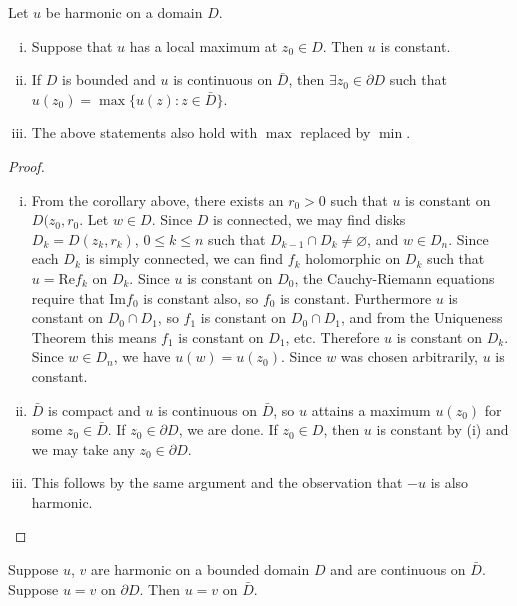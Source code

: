 \begin{theorem}
Let $u$ be harmonic on a domain $D$.
\begin{enumerate}[(i)]
  \item{
    Suppose that $u$ has a local maximum at $z_0 \in D$.
    Then $u$ is constant.
  }
  \item{
    If $D$ is bounded and $u$ is continuous on $\bar{D}$, then
    $\exists z_0 \in \partial D$ such that
    $u(z_0) = \max \{ u(z) : z \in \bar{D} \}$.
  }
  \item{
    The above statements also hold with $\max$ replaced by
    $\min$.
  }
\end{enumerate}
\end{theorem}
\begin{proof}
  \begin{enumerate}[(i)]
    \item{
      From the corollary above, there exists an $r_0 > 0$
      such that $u$ is constant on $D(z_0, r_0$. Let
      $w \in D$. Since $D$ is connected, we may find disks
      $D_k = D(z_k, r_k)$, $0 \leq k \leq n$ such that
      $D_{k-1} \cap D_k \neq \varnothing$, and $w \in D_n$.
      Since each $D_k$ is simply connected, we can find $f_k$
      holomorphic on $D_k$ such that $u = \mathrm{Re} f_k$ on $D_k$.
      Since $u$ is constant on $D_0$, the Cauchy-Riemann equations
      require that $\mathrm{Im} f_0$ is constant also, so $f_0$ is
      constant. Furthermore $u$ is constant on $D_0 \cap D_1$,
      so $f_1$ is constant on $D_0 \cap D_1$, and from the Uniqueness
      Theorem this means $f_1$ is constant on $D_1$, etc.
      Therefore $u$ is constant on $D_k$. Since $w \in D_n$, we have
      $u(w) = u(z_0)$. Since $w$ was chosen arbitrarily, $u$ is constant.
    }
    \item{
      $\bar{D}$ is compact and $u$ is continuous on $\bar{D}$, so
      $u$ attains a maximum $u(z_0)$ for some $z_0 \in \bar{D}$.
      If $z_0 \in \partial D$, we are done. If $z_0 \in D$, then $u$ is
      constant by (i) and we may take any $z_0 \in \partial D$.
    }
    \item{
      This follows by the same argument and the observation that $-u$ is
      also harmonic.
    }
  \end{enumerate}
\end{proof}

\begin{corol}
Suppose $u$, $v$ are harmonic on a bounded domain $D$ and are
continuous on $\bar{D}$. Suppose $u = v$ on $\partial D$. Then
$u = v$ on $\bar{D}$.
\end{corol}

